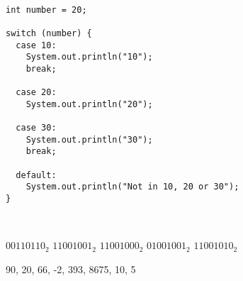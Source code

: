 \documentclass[11pt,addpoints]{exam}
\begin{document}
\begin{questions}
\begin{minipage}{\textwidth}
\begin{choices}
   \\
\end{choices}
\end{minipage}

\begin{minipage}{\textwidth}

\begin{verbatim}
int number = 20;

switch (number) {
  case 10:
    System.out.println("10");
    break;

  case 20:
    System.out.println("20");

  case 30:
    System.out.println("30");
    break;

  default:
    System.out.println("Not in 10, 20 or 30");
}
\end{verbatim}

\begin{choices}
   \\
\end{choices}

\end{minipage}

\begin{minipage}{\textwidth}

\begin{choices}
  \choice $00110110_{2}$
  \choice $11001001_{2}$
  \choice $11001000_{2}$
  \choice $01001001_{2}$
  \choice $11001010_{2}$ \\ %
\end{choices}
\end{minipage}

\begin{minipage}{\textwidth}

90, 20, 66, -2, 393, 8675, 10, 5 \\


\end{minipage}
\end{questions}
\end{document}
